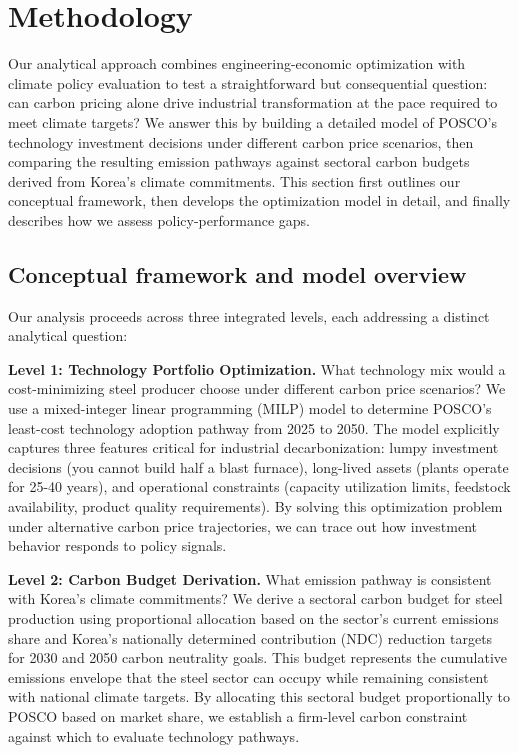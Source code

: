 \documentclass[preprint,1p,authoryear]{elsarticle}
\begin{document}
\section{Methodology}

Our analytical approach combines engineering-economic optimization with climate policy evaluation to test a straightforward but consequential question: can carbon pricing alone drive industrial transformation at the pace required to meet climate targets? We answer this by building a detailed model of POSCO's technology investment decisions under different carbon price scenarios, then comparing the resulting emission pathways against sectoral carbon budgets derived from Korea's climate commitments. This section first outlines our conceptual framework, then develops the optimization model in detail, and finally describes how we assess policy-performance gaps.

\subsection{Conceptual framework and model overview}

Our analysis proceeds across three integrated levels, each addressing a distinct analytical question:

\textbf{Level 1: Technology Portfolio Optimization.} What technology mix would a cost-minimizing steel producer choose under different carbon price scenarios? We use a mixed-integer linear programming (MILP) model to determine POSCO's least-cost technology adoption pathway from 2025 to 2050. The model explicitly captures three features critical for industrial decarbonization: lumpy investment decisions (you cannot build half a blast furnace), long-lived assets (plants operate for 25-40 years), and operational constraints (capacity utilization limits, feedstock availability, product quality requirements). By solving this optimization problem under alternative carbon price trajectories, we can trace out how investment behavior responds to policy signals.

\textbf{Level 2: Carbon Budget Derivation.} What emission pathway is consistent with Korea's climate commitments? We derive a sectoral carbon budget for steel production using proportional allocation based on the sector's current emissions share and Korea's nationally determined contribution (NDC) reduction targets for 2030 and 2050 carbon neutrality goals. This budget represents the cumulative emissions envelope that the steel sector can occupy while remaining consistent with national climate targets. By allocating this sectoral budget proportionally to POSCO based on market share, we establish a firm-level carbon constraint against which to evaluate technology pathways.
\end{document}
